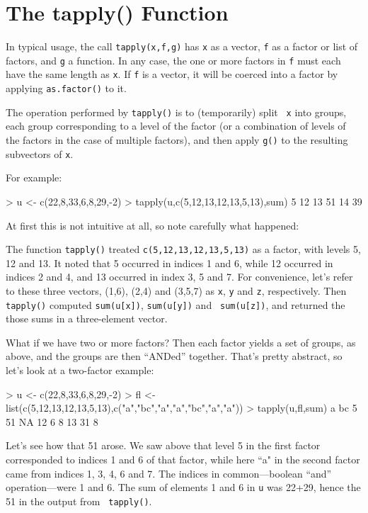 \section{The tapply() Function}
\label{tapply}

In typical usage, the call {\tt tapply(x,f,g)} has {\tt x} as a vector,
{\tt f} as a factor or list of factors, and {\tt g} a function.  In any
case, the one or more factors in {\tt f} must each have the same length
as {\tt x}.  If {\tt f} is a vector, it will be coerced into a factor by
applying {\tt as.factor()} to it.  

The operation performed by {\tt tapply()} is to (temporarily) split {\tt
x} into groups, each group corresponding to a level of the factor (or a
combination of levels of the factors in the case of multiple factors),
and then apply {\tt g()} to the resulting subvectors of {\tt x}.  

For example:

\begin{Code}
> u <- c(22,8,33,6,8,29,-2)
> tapply(u,c(5,12,13,12,13,5,13),sum)
 5 12 13 
51 14 39 
\end{Code}

\noindent At first this is not intuitive at all, so note carefully what
happened:  

The function {\tt tapply()} treated {\tt c(5,12,13,12,13,5,13)} as a
factor, with levels 5, 12 and 13.  It noted that 5 occurred in indices 1
and 6, while 12 occurred in indices 2 and 4, and 13 occurred in index 3,
5 and 7.   For convenience, let's refer to these three vectors, (1,6),
(2,4) and (3,5,7) as {\tt x}, {\tt y} and {\tt z}, respectively.
Then {\tt tapply()} computed {\tt sum(u[x])}, {\tt sum(u[y])} and {\tt
sum(u[z])}, and returned the those sums in a three-element vector.

What if we have two or more factors?  Then each factor yields a set of
groups, as above, and the groups are then ``ANDed'' together.  That's
pretty abstract, so let's look at a two-factor example:

\begin{Code}
> u <- c(22,8,33,6,8,29,-2)
> fl <- list(c(5,12,13,12,13,5,13),c("a","bc","a","a","bc","a","a"))
> tapply(u,fl,sum)
    a bc
5  51 NA
12  6  8
13 31  8
\end{Code}

Let's see how that 51 arose.  We saw above that level 5 in the first
factor corresponded to indices 1 and 6 of that factor, while here ``a"
in the second factor came from indices 1, 3, 4, 6 and 7.  The indices in
common---boolean ``and'' operation---were 1 and 6.  The sum of elements
1 and 6 in {\tt u} was 22+29, hence the 51 in the output from {\tt
tapply()}.

